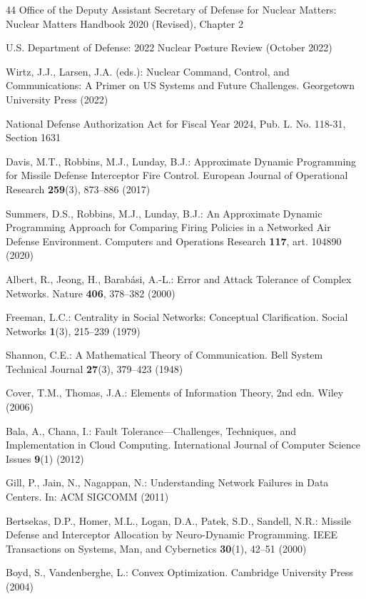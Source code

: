 \documentclass[runningheads]{llncs}
\begin{document}
\begin{thebibliography}{44}
 Office of the Deputy Assistant Secretary of Defense for Nuclear Matters: Nuclear Matters Handbook 2020 (Revised), Chapter 2

 U.S. Department of Defense: 2022 Nuclear Posture Review (October 2022)

 Wirtz, J.J., Larsen, J.A. (eds.): Nuclear Command, Control, and Communications: A Primer on US Systems and Future Challenges. Georgetown University Press (2022)

 National Defense Authorization Act for Fiscal Year 2024, Pub. L. No. 118-31, Section 1631

 Davis, M.T., Robbins, M.J., Lunday, B.J.: Approximate Dynamic Programming for Missile Defense Interceptor Fire Control. European Journal of Operational Research \textbf{259}(3), 873--886 (2017)

 Summers, D.S., Robbins, M.J., Lunday, B.J.: An Approximate Dynamic Programming Approach for Comparing Firing Policies in a Networked Air Defense Environment. Computers and Operations Research \textbf{117}, art. 104890 (2020)

 Albert, R., Jeong, H., Barab\'{a}si, A.-L.: Error and Attack Tolerance of Complex Networks. Nature \textbf{406}, 378--382 (2000)

 Freeman, L.C.: Centrality in Social Networks: Conceptual Clarification. Social Networks \textbf{1}(3), 215--239 (1979)

 Shannon, C.E.: A Mathematical Theory of Communication. Bell System Technical Journal \textbf{27}(3), 379--423 (1948)

 Cover, T.M., Thomas, J.A.: Elements of Information Theory, 2nd edn. Wiley (2006)

 Bala, A., Chana, I.: Fault Tolerance---Challenges, Techniques, and Implementation in Cloud Computing. International Journal of Computer Science Issues \textbf{9}(1) (2012)

 Gill, P., Jain, N., Nagappan, N.: Understanding Network Failures in Data Centers. In: ACM SIGCOMM (2011)

 Bertsekas, D.P., Homer, M.L., Logan, D.A., Patek, S.D., Sandell, N.R.: Missile Defense and Interceptor Allocation by Neuro-Dynamic Programming. IEEE Transactions on Systems, Man, and Cybernetics \textbf{30}(1), 42--51 (2000)

 Boyd, S., Vandenberghe, L.: Convex Optimization. Cambridge University Press (2004)


\end{thebibliography}
\end{document}
